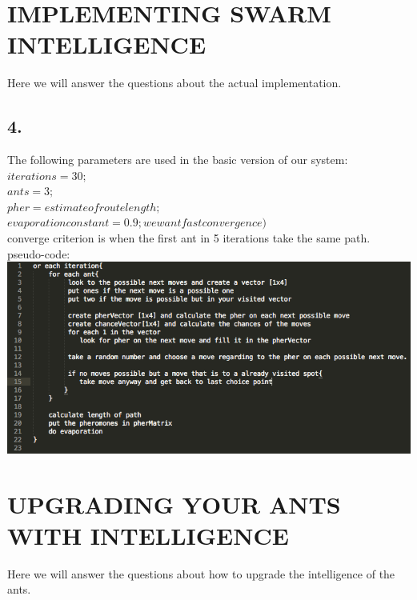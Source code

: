 \documentclass{scrartcl}
\begin{document}
 \section*{IMPLEMENTING SWARM INTELLIGENCE}
 Here we will answer the questions about the actual implementation.
 
 \subsection*{4.}
 The following parameters are used in the basic version of our system:\\
 $ iterations = 30; $\\
 $ ants = 3; $ \\
 $ pher = estimate of route length; $\\
 $ evaporation constant = 0.9;we want fast convergence) $\\ 
converge criterion is when the first ant in 5 iterations take the same path.\\
pseudo-code:\\
\includegraphics[width=1\textwidth]{pseudo.PNG}

\pagebreak
\section{UPGRADING YOUR ANTS WITH INTELLIGENCE}
Here we will answer the questions about how to upgrade the intelligence of the ants.
\end{document}
